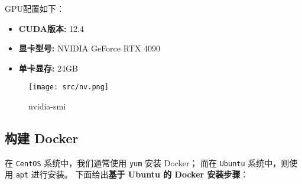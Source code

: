 \documentclass[UTF8]{ctexart}
\begin{document}
GPU配置如下：

\begin{itemize}
    \item \textbf{CUDA版本:} 12.4 
    \item \textbf{显卡型号:} NVIDIA GeForce RTX 4090 
    \item \textbf{单卡显存:} 24GB
\end{itemize}

\begin{figure}[H]
    \centering
    \texttt{[image: src/nv.png]}
    \caption{nvidia-smi}
\end{figure}

\subsection{构建 Docker}

在 \texttt{CentOS} 系统中，我们通常使用 \texttt{yum} 安装 Docker；
而在 \texttt{Ubuntu} 系统中，则使用 \texttt{apt} 进行安装。
下面给出\textbf{基于 Ubuntu 的 Docker 安装步骤}：
\end{document}
